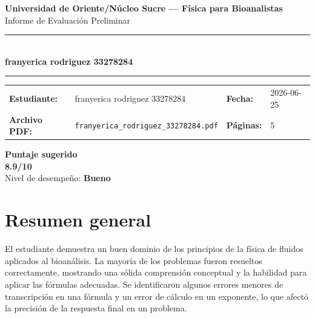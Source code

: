 \documentclass[11pt,a4paper]{article}
\begin{document}
\begin{center}
  {\Large\bfseries\color{azulTitulo} Universidad de Oriente/Núcleo Sucre --- Física para Bioanalistas}\\[4pt]
  {\large Informe de Evaluación Preliminar}\\[12pt]
  \rule{\linewidth}{1.2pt}\\[6pt]
  {\LARGE\bfseries franyerica rodriguez 33278284}\\[4pt]
  \rule{\linewidth}{0.6pt}
\end{center}

\vspace{4pt}
\begin{tcolorbox}[cajaTitulo, title=Datos del informe]
\begin{tabular}{@{}llll@{}}
  \textbf{Estudiante:}  & franyerica rodriguez 33278284  &
  \textbf{Fecha:}       & 2026-06-25 \\[4pt]
  \textbf{Archivo PDF:} & \texttt{franyerica\_rodriguez\_33278284.pdf}  &
  \textbf{Páginas:}     & 5 \\
\end{tabular}
\end{tcolorbox}

\vspace{6pt}
\begin{center}
  \begin{tcolorbox}[
    enhanced,
    colback=white, colframe=desempeno_bueno,
    width=0.62\linewidth,
    boxrule=2pt,
    halign=center, valign=center,
    top=8pt, bottom=8pt,
  ]
    \centering
    {\large\bfseries Puntaje sugerido}\\[6pt]
    {\Huge\bfseries\color{desempeno_bueno} 8.9/10}\\[6pt]
    {\large Nivel de desempeño: \textbf{\color{desempeno_bueno} Bueno}}
  \end{tcolorbox}
\end{center}

\section*{Resumen general}
El estudiante demuestra un buen dominio de los principios de la física de fluidos aplicados al bioanálisis. La mayoría de los problemas fueron resueltos correctamente, mostrando una sólida comprensión conceptual y la habilidad para aplicar las fórmulas adecuadas. Se identificaron algunos errores menores de transcripción en una fórmula y un error de cálculo en un exponente, lo que afectó la precisión de la respuesta final en un problema.
\end{document}
